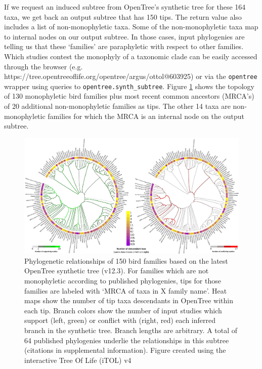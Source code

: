 \documentclass[oupdraft]{sysbio_sse}
\begin{document}
If we request an induced subtree from OpenTree's synthetic tree for these 164 taxa, we get back an output subtree that has 150 tips. The return value also includes a list of non-monophyletic taxa.
Some of the non-monophyletic taxa map to internal nodes on our output subtree. In those cases, input phylogenies are telling us that these `families' are paraphyletic with respect to other families. Which studies contest the monophyly of a taxonomic clade can be easily accessed through the browser (e.g. https://tree.opentreeoflife.org/opentree/argus/ottol@603925) or via the \texttt{opentree} wrapper using queries to \texttt{opentree.synth\_subtree}. Figure \ref{birdfams} shows the topology of 130 monophyletic bird families plus most recent common ancestors (MRCA's) of 20 additional non-monophyletic families as tips. The other 14 taxa are non-monophyletic families for which the MRCA is an internal node on the output subtree.


\begin{figure}[!h]
\centering\includegraphics[width=\textwidth]{bird_fam_fig_rev}

\caption{Phylogenetic relationships of 150 bird families based on the latest OpenTree synthetic tree (v12.3). For families which are not monophyletic according to published phylogenies, tips for those families are labeled with `MRCA of taxa in X family name'. Heat maps show the number of tip taxa descendants in OpenTree within each tip. Branch colors show the number of input studies which support (left, green) or conflict with (right, red) each inferred branch in the synthetic tree. Branch lengths are arbitrary. A total of 64 published phylogenies underlie the relationships in this subtree (citations in supplemental information). Figure created using the interactive Tree Of Life (iTOL) v4 \citep{letunic_interactive_2019}}
\label{birdfams}
\end{figure}
\end{document}
